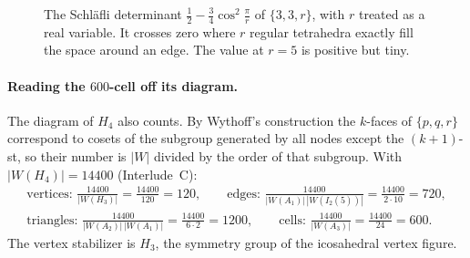 \documentclass[11pt,openany]{book}
\theoremstyle{plain}
\theoremstyle{definition}
\theoremstyle{remark}
\newcommand{\abs}[1]{\left\lvert #1 \right\rvert}
\begin{document}
\begin{figure}[ht]
\centering
{}
\caption{The Schl\"afli determinant $\frac12-\frac34\cos^2\frac\pi r$ of $\{3,3,r\}$, with $r$ treated as
a real variable. It crosses zero where $r$ regular tetrahedra exactly fill the space around an edge.
The value at $r=5$ is positive but tiny.}
\label{DYN:fig:gram}
\end{figure}

\paragraph{Reading the $600$-cell off its diagram.} The diagram of $H_4$ also counts. By Wythoff's
construction the $k$-faces of $\{p,q,r\}$ correspond to cosets of the subgroup generated by all nodes
except the $(k+1)$-st, so their number is $\abs W$ divided by the order of that subgroup. With
$\abs{W(H_4)}=14400$ (Interlude~C):
\begin{gather*}
  \text{vertices: }\frac{14400}{\abs{W(H_3)}}=\frac{14400}{120}=120,\qquad
  \text{edges: }\frac{14400}{\abs{W(A_1)}\,\abs{W(I_2(5))}}=\frac{14400}{2\cdot10}=720,\\
  \text{triangles: }\frac{14400}{\abs{W(A_2)}\,\abs{W(A_1)}}=\frac{14400}{6\cdot2}=1200,\qquad
  \text{cells: }\frac{14400}{\abs{W(A_3)}}=\frac{14400}{24}=600 .
\end{gather*}
The vertex stabilizer is $H_3$, the symmetry group of the icosahedral vertex figure.
\end{document}
